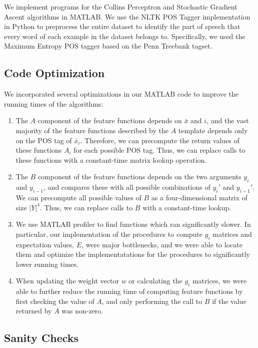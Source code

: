 \documentclass[11pt,a4paper,oneside]{article}
\begin{document}
We implement programs for the Collins Perceptron and Stochastic Gradient Ascent algorithms in MATLAB. We use the NLTK POS Tagger \cite{nltk} implementation in Python to preprocess the entire dataset to identify the part of speech that every word of each example in the dataset belongs to. Specifically, we used the Maximum Entropy POS tagger based on the Penn Treebank tagset.\cite{maxentpostagger} 

\subsection{Code Optimization}

We incorporated several optimizations in our MATLAB code to improve the running times of the algorithms:

\begin{enumerate}
\item The $A$ component of the feature functions depends on $\bar{x}$ and $i$, and the vast majority of the feature functions described by the $A$ template depends only on the POS tag of $\bar{x}_i$. Therefore, we can precompute the return values of these functions $A_i$ for each possible POS tag. Thus, we can replace calls to these functions with a constant-time matrix lookup operation.
\item The $B$ component of the feature functions depends on the two arguments $y_i$ and $y_{i-1}$, and compares these with all possible combinations of $y_i'$ and $y_{i-1}'$. We can precompute all possible values of $B$ as a four-dimensional matrix of size $|Y|^4$. Thus, we can replace calls to $B$ with a constant-time lookup.
\item We use MATLAB profiler to find functions which ran significantly slower. In particular, our implementation of the procedures to compute $g_i$ matrices and expectation values, $E$, were major bottlenecks, and we were able to locate them and optimize the implementatations for the procedures to significantly lower running times.
\item When updating the weight vector $w$ or calculating the $g_i$ matrices, we were able to further reduce the running time of computing feature functions by first checking the value of $A$, and only performing the call to $B$ if the value returned by $A$ was non-zero.
\end{enumerate}

\subsection{Sanity Checks}
\end{document}
